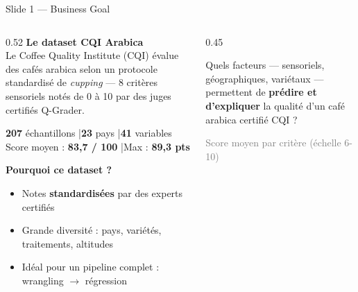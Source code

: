 \documentclass[aspectratio=169,12pt]{beamer}
\begin{document}
\begin{frame}{\faLeaf\quad Slide 1 — Business Goal}
\vspace{-0.3cm}
\begin{columns}[T]
\begin{column}{0.52\textwidth}
  \textbf{\textcolor{coffeebrown}{Le dataset CQI Arabica}}\\[0.3cm]
  Le Coffee Quality Institute (CQI) évalue des cafés arabica
  selon un protocole standardisé de \textit{cupping} — 8 critères
  sensoriels notés de 0 à 10 par des juges certifiés Q-Grader.\\[0.4cm]

  \begin{statbox}
    \begin{center}
      \textbf{207} échantillons \quad|\quad \textbf{23} pays \quad|\quad \textbf{41} variables\\
      Score moyen : \textbf{83,7 / 100} \quad|\quad Max : \textbf{89,3 pts}
    \end{center}
  \end{statbox}
  \vspace{0.4cm}

  \textbf{\textcolor{coffeebrown}{Pourquoi ce dataset ?}}
  \begin{itemize}\small
    \item Notes \textbf{standardisées} par des experts certifiés
    \item Grande diversité : pays, variétés, traitements, altitudes
    \item Idéal pour un pipeline complet : wrangling $\to$ régression
  \end{itemize}
\end{column}
\begin{column}{0.45\textwidth}
  \begin{insightbox}
    \small Quels facteurs — sensoriels, géographiques, variétaux —
    permettent de \textbf{prédire et d'expliquer} la qualité
    d'un café arabica certifié CQI ?
  \end{insightbox}
  \vspace{0.4cm}
  \centering
  \vspace{0.1cm}
  {\tiny\textcolor{gray}{Score moyen par critère (échelle 6-10)}}
\end{column}
\end{columns}
\end{frame}
\end{document}
